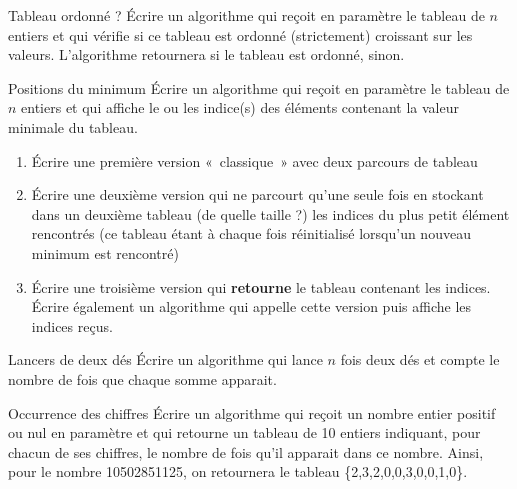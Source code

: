 	\begin{Exercice}{Tableau ordonné ?}
		Écrire un algorithme qui reçoit en paramètre 
		le tableau  de $n$ entiers 
		et qui vérifie si ce tableau est ordonné 
		(strictement) croissant sur les valeurs. 
		L'algorithme retournera  si le tableau est ordonné,
		 sinon.
	\end{Exercice}
	
	\begin{Exercice}{Positions du minimum}
		Écrire un algorithme qui reçoit en paramètre le tableau
		 de $n$ entiers et qui
		affiche le ou les indice(s) des éléments 
		contenant la valeur minimale du tableau.
	
		\begin{enumerate}[label=\alph*)]
		\item 
			Écrire une première version «~classique~» avec deux parcours de tableau
		\item
			Écrire une deuxième version qui ne parcourt qu’une seule fois 
			 en
			stockant dans un deuxième tableau (de quelle taille ?)
			les indices du plus petit élément
			rencontrés (ce tableau étant à chaque fois réinitialisé lorsqu’un
			nouveau minimum est rencontré)
		\item
			Écrire une troisième version qui \textbf{retourne} 
			le tableau contenant les indices.
			Écrire également un algorithme 
			qui appelle cette version puis affiche les indices reçus. 
		\end{enumerate}
	\end{Exercice}

	\begin{Exercice}{Lancers de deux dés}
		Écrire un algorithme qui lance $n$ fois deux dés
		et compte le nombre de fois que chaque somme apparait.
		\begin{LDA}
		\end{LDA}
	\end{Exercice}
	
	\begin{Exercice}{Occurrence des chiffres}
		Écrire un algorithme qui reçoit 
		un nombre entier positif ou nul en paramètre
		et qui retourne un tableau de 10 entiers
		indiquant, pour chacun de ses chiffres, 
		le nombre de fois qu’il apparait dans ce nombre. 
		Ainsi, pour le nombre 10502851125, on retournera
		le tableau \{2,3,2,0,0,3,0,0,1,0\}.
	\end{Exercice}
	
